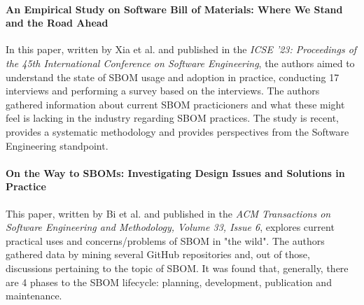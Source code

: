 \paragraph{An Empirical Study on Software Bill of Materials: Where We Stand and the Road Ahead} \cite{article:sbom-study} In this paper, written by Xia et al. and published in the \emph{ICSE '23: Proceedings of the 45th International Conference on Software Engineering}, the authors aimed to understand the state of SBOM usage and adoption in practice, conducting 17 interviews and performing a survey based on the interviews. The authors gathered information about current SBOM practicioners and what these might feel is lacking in the industry regarding SBOM practices. The study is recent, provides a systematic methodology and provides perspectives from the Software Engineering standpoint.

\paragraph{On the Way to SBOMs: Investigating Design Issues and Solutions in Practice} \cite{article:sboms-issues-solutions} This paper, written by Bi et al. and published in the \emph{ACM Transactions on Software Engineering and Methodology, Volume 33, Issue 6}, explores current practical uses and concerns/problems of SBOM in "the wild". The authors gathered data by mining several GitHub repositories and, out of those, discussions pertaining to the topic of SBOM. It was found that, generally, there are 4 phases to the SBOM lifecycle: planning, development, publication and maintenance.

